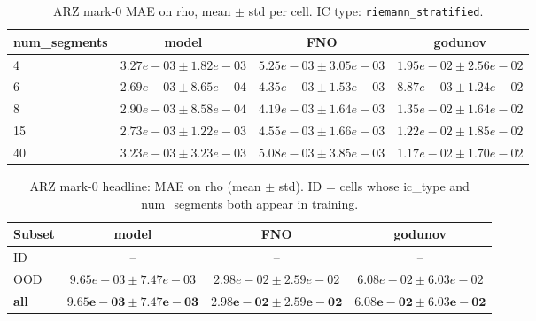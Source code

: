 \begin{table}[h]
\centering
\caption{ARZ mark-0 MAE on rho, mean $\pm$ std per cell. IC type: \texttt{riemann_stratified}.}
\label{tab:arz_mark0_paper_eval_riemann_stratified}
\begin{tabular}{lccc}
\hline
num\_segments & model & FNO & godunov \\
\hline
4 & $3.27e-03 \pm 1.82e-03$ & $5.25e-03 \pm 3.05e-03$ & $1.95e-02 \pm 2.56e-02$ \\
6 & $2.69e-03 \pm 8.65e-04$ & $4.35e-03 \pm 1.53e-03$ & $8.87e-03 \pm 1.24e-02$ \\
8 & $2.90e-03 \pm 8.58e-04$ & $4.19e-03 \pm 1.64e-03$ & $1.35e-02 \pm 1.64e-02$ \\
15 & $2.73e-03 \pm 1.22e-03$ & $4.55e-03 \pm 1.66e-03$ & $1.22e-02 \pm 1.85e-02$ \\
40 & $3.23e-03 \pm 3.23e-03$ & $5.08e-03 \pm 3.85e-03$ & $1.17e-02 \pm 1.70e-02$ \\
\hline
\end{tabular}
\end{table}

\begin{table}[h]
\centering
\caption{ARZ mark-0 headline: MAE on rho (mean $\pm$ std). ID = cells whose ic\_type and num\_segments both appear in training.}
\label{tab:arz_mark0_paper_eval_headline}
\begin{tabular}{lccc}
\hline
Subset & model & FNO & godunov \\
\hline
ID & -- & -- & -- \\
OOD & $9.65e-03 \pm 7.47e-03$ & $2.98e-02 \pm 2.59e-02$ & $6.08e-02 \pm 6.03e-02$ \\
\textbf{all} & $\mathbf{9.65e-03 \pm 7.47e-03}$ & $\mathbf{2.98e-02 \pm 2.59e-02}$ & $\mathbf{6.08e-02 \pm 6.03e-02}$ \\
\hline
\end{tabular}
\end{table}

